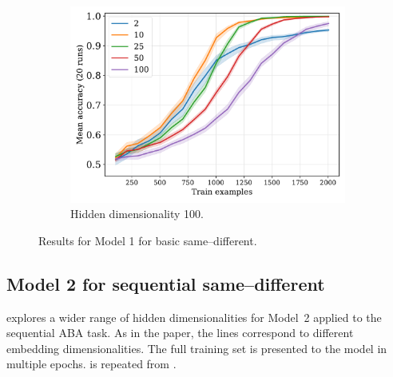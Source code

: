 \begin{figure}[H]
  \begin{subfigure}{0.45\linewidth}
    \includegraphics[width=1\textwidth]{../fig/equality-train_size-embed_dim-hidden_dim=100.pdf}
    \caption{Hidden dimensionality 100.}
    \label{fig:model1-rep}
  \end{subfigure}
  \caption{Results for Model 1 for basic same--different.}
  \label{fig:model1}
\end{figure}


\newpage


\subsection{Model 2 for sequential same--different}

 explores a wider range of hidden dimensionalities for Model~2 applied to the sequential ABA task. As in the paper, the lines correspond to different embedding dimensionalities. The full training set is presented to the model in multiple epochs.  is repeated from .

